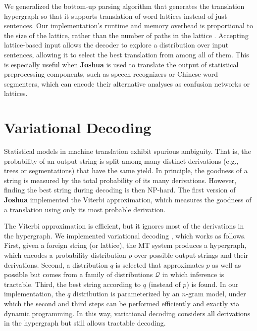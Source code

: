 \documentclass[11pt]{article}
\newcommand{\joshua}{\textbf{Joshua}\xspace}
\begin{document}
We generalized the bottom-up parsing algorithm that generates the translation hypergraph so that it supports translation of word lattices instead of just sentences.  Our implementation's runtime and memory overhead is proportional to the size of the lattice, rather than the number of paths in the lattice \cite{dyer-muresan-resnik:2008:ACLMain}.  Accepting lattice-based input allows the decoder to explore a distribution over input sentences,  allowing it to select the best translation from among all of them.  This is especially useful when \joshua is used to translate the output of statistical preprocessing components, such as speech recognizers or Chinese word segmenters, which can encode their alternative analyses as confusion networks or lattices. 

\section{Variational Decoding}

Statistical models in machine translation exhibit spurious ambiguity.
That is, the probability of an output string is split
among many distinct derivations (e.g., trees or
segmentations) that have the same yield. In principle, the goodness of a
string is measured by the total probability of its
many derivations. However, finding the best string
during decoding is then NP-hard.
The first version of \joshua implemented the
Viterbi approximation, which measures the goodness 
of a translation using only its most probable derivation.

The Viterbi approximation is efficient, but it ignores most of the derivations in the hypergraph.
We implemented variational decoding \cite{variational-decoding-acl09}, which works as follows.
First, given a foreign string (or lattice), the MT system produces a hypergraph, 
which encodes a probability distribution $p$ over 
possible output strings and their derivations.
Second, a distribution $q$ is selected that approximates $p$ as well as possible but comes from a family of distributions $\mathcal{Q}$ in which inference is tractable.  Third, the best string according to $q$ (instead of $p$) is found.
In our implementation, the $q$ distribution is parameterized by an $n$-gram model, under which 
the second and third steps can be performed efficiently and exactly via dynamic programming.
In this way, variational decoding considers all derivations in the hypergraph but still
allows tractable decoding. 
\end{document}
